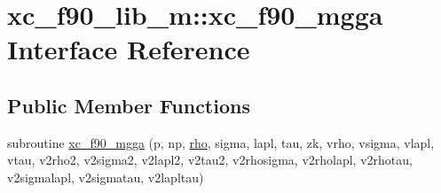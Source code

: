 \hypertarget{interfacexc__f90__lib__m_1_1xc__f90__mgga}{\section{xc\-\_\-f90\-\_\-lib\-\_\-m\-:\-:xc\-\_\-f90\-\_\-mgga Interface Reference}
\label{interfacexc__f90__lib__m_1_1xc__f90__mgga}
}
\subsection*{Public Member Functions}
\begin{DoxyCompactItemize}
\item 
subroutine \hyperlink{interfacexc__f90__lib__m_1_1xc__f90__mgga_acc84840fa745c2d343c7ed97fd591410}{xc\-\_\-f90\-\_\-mgga} (p, np, \hyperlink{md_8h_a52b35cee8a5db846ce98f4904e1c8b13}{rho}, sigma, lapl, tau, zk, vrho, vsigma, vlapl, vtau, v2rho2, v2sigma2, v2lapl2, v2tau2, v2rhosigma, v2rholapl, v2rhotau, v2sigmalapl, v2sigmatau, v2lapltau)
\end{DoxyCompactItemize}


